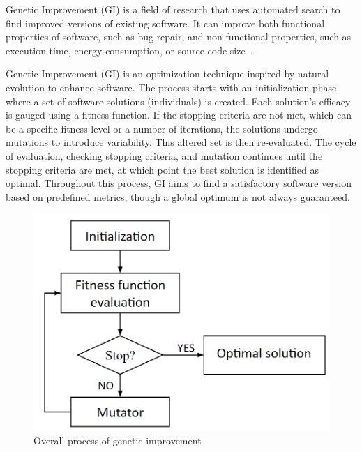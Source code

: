 
Genetic Improvement (GI) is a field of research that uses automated search to find improved versions of existing software. It can improve both functional properties of software, such as bug repair, and non-functional properties, such as execution time, energy consumption, or source code size~\cite{DBLP:journals/tec/PetkeHHLWW18,DBLP:conf/gecco/ZuoBP22}. 

\vspace{.5em}
Genetic Improvement (GI) is an optimization technique inspired by natural evolution to enhance software. The process starts with an initialization phase where a set of software solutions (individuals) is created. Each solution's efficacy is gauged using a fitness function. If the stopping criteria are not met, which can be a specific fitness level or a number of iterations, the solutions undergo mutations to introduce variability. This altered set is then re-evaluated. The cycle of evaluation, checking stopping criteria, and mutation continues until the stopping criteria are met, at which point the best solution is identified as optimal. Throughout this process, GI aims to find a satisfactory software version based on predefined metrics, though a global optimum is not always guaranteed.

\begin{figure}[h]
  \centering
  \includegraphics[width=.5\textwidth]{img/Genetic_Improvement_.png}
  \caption{Overall process of genetic improvement}
  \label{fig:Genetic_improvement_process}
\end{figure}



